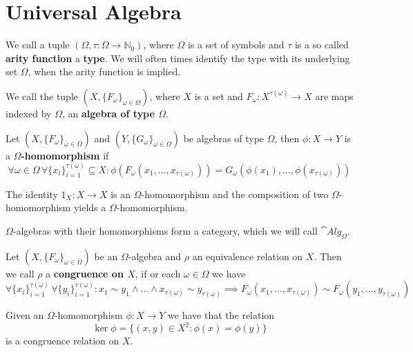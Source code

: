 \section{Universal Algebra}
\begin{definition}
    We call a tuple $(\Omega,\tau : \Omega \to \mathbb{N}_0)$,
    where $\Omega$ is a set of symbols and $\tau$ is a so called \textbf{arity function}
    a \textbf{type}. We will often times identify the type with
    its underlying set $\Omega$, when the arity function is implied.
\end{definition}
\begin{definition}
    We call the tuple $(X,\{F_\omega\}_{\omega\in\Omega})$, where
    $X$ is a set and $F_\omega : X^{\tau(\omega)} \to X$ are maps
    indexed by $\Omega$, an \textbf{algebra of type $\Omega$}.
\end{definition}
\begin{definition}
    Let $(X,\{F_\omega\}_{\omega\in\Omega})$ and $(Y,\{G_\omega\}_{\omega\in\Omega})$
    be algebras of type $\Omega$, then $\phi: X\to Y$ is a 
    \textbf{$\Omega$-homomorphism} if 
    \[
        \forall\omega\in\Omega\,\forall \{x_i\}_{i=1}^{\tau(\omega)}\subseteq X :
        \phi(F_\omega(x_1,\dots,x_{\tau(\omega)})) = G_\omega(\phi(x_1),\dots,\phi(x_{\tau(\omega)}))
    \]
\end{definition}
\begin{proposition}
    The identity $1_X : X \to X$ is an $\Omega$-homomorphism and 
    the composition of two $\Omega$-homomorphism yields a $\Omega$-homomorphism.
\end{proposition}
\begin{proposition}
    $\Omega$-algebras with their homomorphisms form a category, which
    we will call $\cat{Alg}_\Omega$.
\end{proposition}
\begin{definition}
    Let $(X,\{F_\omega\}_{\omega\in\Omega})$ be an $\Omega$-algebra and
    $\rho$ an equivalence relation on $X$. Then we call $\rho$ a \textbf{congruence
    on $X$}, if or each $\omega\in\Omega$ we have
    \[
        \forall \{x_i\}_{i=1}^{\tau(\omega)}\,\forall \{y_i\}_{i=1}^{\tau(\omega)} : x_1\sim y_1 \land\dots\land x_{\tau(\omega)} \sim y_{\tau(\omega)} 
        \implies F_\omega(x_1,\dots,x_{\tau(\omega)})\sim F_\omega(y_1,\dots,y_{\tau(\omega)})
    \]
\end{definition}
\begin{proposition}
    Given an $\Omega$-homomorphism $\phi : X\to Y$ we have that
    the relation 
    \[\ker\phi = \{(x,y) \in X^2 : \phi(x)=\phi(y)\}\] is a congruence relation on $X$.
\end{proposition}
